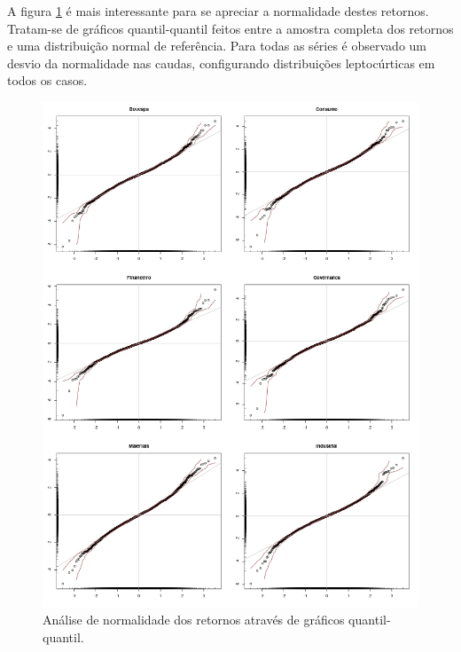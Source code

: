 \documentclass[1p]{elsarticle}
\theoremstyle{definition}
\begin{document}


A figura \ref{fig:artigo-qqplots} é mais interessante para se apreciar a normalidade destes retornos. Tratam-se de gráficos quantil-quantil feitos entre a amostra completa dos retornos e uma distribuição normal de referência. Para todas as séries é observado um desvio da normalidade nas caudas, configurando distribuições leptocúrticas em todos os casos.

\begin{figure}[h]
	\centering
	\includegraphics[width=1\linewidth]{figs/artigo-qqplots}
	\caption{Análise de normalidade dos retornos através de gráficos quantil-quantil.}
	\label{fig:artigo-qqplots}
\end{figure}
\end{document}
